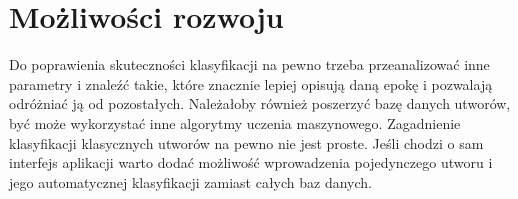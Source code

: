 \documentclass[printmode, eng]{mgr}
\newcommand\tab[1][1cm]{\hspace*{#1}}
\begin{document}
\section{Możliwości rozwoju}
\tab Do poprawienia skuteczności klasyfikacji na pewno trzeba przeanalizować inne parametry i znaleźć takie, które znacznie lepiej opisują daną epokę i pozwalają odróżniać ją od pozostałych. Należałoby również poszerzyć bazę danych utworów, być może wykorzystać inne algorytmy uczenia maszynowego. Zagadnienie klasyfikacji klasycznych utworów na pewno nie jest proste. Jeśli chodzi o sam interfejs aplikacji warto dodać możliwość wprowadzenia pojedynczego utworu i jego automatycznej klasyfikacji zamiast całych baz danych.
\begin{flushleft}
\begin{thebibliography}{99}


\end{thebibliography}
\end{flushleft}
\end{document}
